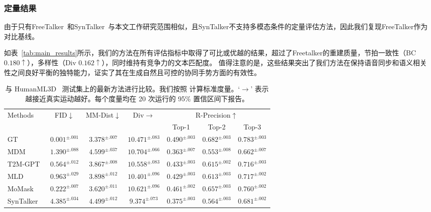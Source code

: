 \subsubsection{定量结果}
由于只有FreeTalker~\cite{yang2024freetalker}和SynTalker~\cite{chen2024syntalker}与本文工作研究范围相似，且SynTalker不支持多模态条件的定量评估方法，因此我们复现FreeTalker作为对比基线。

如表~\ref{tab:main_results}所示，我们的方法在所有评估指标中取得了可比或优越的结果，超过了Freetalker的重建质量，节拍一致性（BC $0.180\uparrow$），多样性（Div $0.162\uparrow$），同时维持有竞争力的文本匹配度。
值得注意的是，这些结果突出了我们方法在保持语音同步和语义相关性之间良好平衡的独特能力，证实了其在生成自然且可控的协同手势方面的有效性。



\begin{table*}[t]
  \centering
  \caption{与 HumanML3D~\cite{guo2022humanml3d} 测试集上的最新方法进行比较。我们按照 \cite{chen2023executing} 计算标准度量。`$\rightarrow$' 表示越接近真实运动越好。每个度量均在 20 次运行的 95\% 置信区间下报告。}
  \label{tab:h3d_results}
  \small
  \begin{tabular}{l cccccc}
  \toprule
  \multirow{2}{*}{Methods} & \multirow{2}{*}{FID$\downarrow$} & \multirow{2}{*}{MM-Dist$\downarrow$} & \multirow{2}{*}{Div$\rightarrow$} & \multicolumn{3}{c}{R-Precision$\uparrow$} \\
  \cmidrule(lr){5-7}
  & & & & Top-1 & Top-2 & Top-3 \\
  \midrule
  GT  &  $0.001^{\pm .001}$ & $3.378^{\pm .007}$ & $10.471^{\pm .083}$ &  $0.490^{\pm .003}$ & $0.682^{\pm .003}$ & $0.783^{\pm .003}$ \\
  MDM~\cite{tevet2022mdm} & $1.390^{\pm .088}$ & $4.599^{\pm .037}$ & $10.704^{\pm .066}$ & $0.363^{\pm .007}$ & $0.553^{\pm .008}$ & $0.662^{\pm .007}$ \\
  T2M-GPT~\cite{zhang2023t2mgpt} &  $0.564^{\pm .012}$ & $3.867^{\pm .008}$ & $10.558^{\pm .083}$  & $0.433^{\pm .003}$ & $0.615^{\pm .002}$ & $0.716^{\pm .003}$ \\
  MLD~\cite{chen2023executing} & $0.963^{\pm .029}$ & $3.898^{\pm .012}$ & $10.401^{\pm .096}$ & $0.429^{\pm .003}$ & $0.613^{\pm .003}$ & $0.717^{\pm .002}$ \\
  MoMask~\cite{guo2024momask} & $0.222^{\pm .007}$ & $3.620^{\pm .011}$ & $10.621^{\pm .096}$ & $0.461^{\pm .002}$ & $0.657^{\pm .003}$ & $0.760^{\pm .002}$ \\
  SynTalker~\cite{chen2024syntalker} & $4.385^{\pm .034}$ & $4.499^{\pm .012}$ & $9.374^{\pm .073}$ & $0.375^{\pm .003}$ & $0.564^{\pm .003}$ & $0.681^{\pm .002}$ \\

\end{tabular}
\end{table*}
